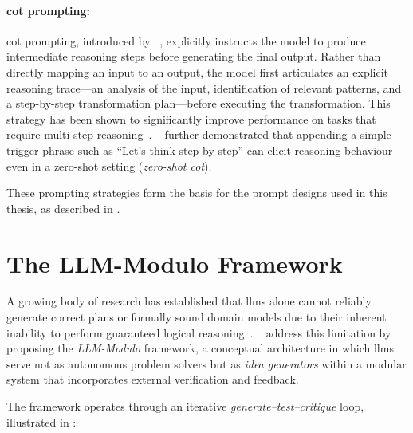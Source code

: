 \paragraph{\gls{cot} prompting:}
\gls{cot} prompting, introduced by \citeauthor{Wei2022}~\cite{Wei2022}, explicitly instructs the model to produce intermediate reasoning steps before generating the final output.
Rather than directly mapping an input to an output, the model first articulates an explicit reasoning trace---an analysis of the input, identification of relevant patterns, and a step-by-step transformation plan---before executing the transformation.
This strategy has been shown to significantly improve performance on tasks that require multi-step reasoning~\cite{Wei2022}.
\citeauthor{Kojima2022}~\cite{Kojima2022} further demonstrated that appending a simple trigger phrase such as \enquote{Let's think step by step} can elicit reasoning behaviour even in a zero-shot setting (\emph{zero-shot \gls{cot}}).

These prompting strategies form the basis for the prompt designs used in this thesis, as described in .

\section{The LLM-Modulo Framework}
\label{sec:bg:llm_modulo}

A growing body of research has established that \glspl{llm} alone cannot reliably generate correct plans or formally sound domain models due to their inherent inability to perform guaranteed logical reasoning~\cite{Valmeekam2023, Kambhampati2024}.
\citeauthor{Kambhampati2024}~\cite{Kambhampati2024} address this limitation by proposing the \emph{LLM-Modulo} framework, a conceptual architecture in which \glspl{llm} serve not as autonomous problem solvers but as \emph{idea generators} within a modular system that incorporates external verification and feedback.

The framework operates through an iterative \emph{generate--test--critique} loop, illustrated in :


